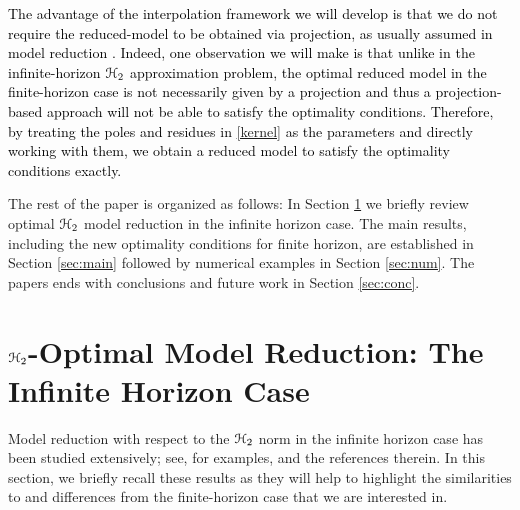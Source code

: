 \documentclass[twocolumn]{autart}
\begin{document}
\textcolor{black}{The advantage of the interpolation framework we will develop  is that 
we do not require the reduced-model to be obtained via projection, as usually assumed in model reduction \cite{Ant05}. Indeed, one observation we will make is that unlike in the infinite-horizon $\EuScript{H}_2$ approximation problem, the optimal reduced model in the finite-horizon case is not necessarily given by a projection and thus a projection-based approach will not be able to satisfy the optimality conditions. Therefore,  
by treating the poles and residues in \eqref{kernel} as the parameters and directly working with them, we  obtain a reduced model to satisfy the optimality conditions exactly.}


The rest of the paper is organized as follows: In Section  \ref{sec:intro} we briefly review optimal  $\EuScript{H}_2$ model reduction in the infinite horizon case. The main results, including the new optimality conditions for finite horizon, are established in Section \ref{sec:main} followed by numerical examples in Section \ref{sec:num}. The papers ends with conclusions and future work in Section \ref{sec:conc}.

\section{$\EuScript{H}_2$-Optimal Model Reduction: The Infinite Horizon Case} \label{sec:intro}
Model reduction with respect to the $\EuScript{H}_2$ norm in the infinite horizon case has been studied extensively; see, for examples, \cite{BarCO91,BryC90,FulO90,MeiL67,Hal92,HylB85,SpaMM92,YanL99,LepMPV91,GugBA08,AniBGA13,Wil70,vuillemin2014poles,CasL18,panzer2013,gerstner2007hom,VanGA08,breiten2013near} and the references therein. 
In this section, we briefly recall these results as they will help to highlight the similarities to and differences from the finite-horizon case that we are interested in.
\end{document}
